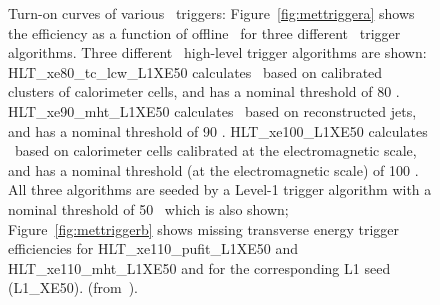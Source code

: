 				\begin{figure}[!htb]
					\centering
					\caption{Turn-on curves of various \met\ triggers: Figure~\ref{fig:mettriggera} shows the efficiency as a function of offline \met\ for three different \met\ trigger algorithms. Three different \met\ high-level trigger algorithms are shown: HLT\_xe80\_tc\_lcw\_L1XE50 calculates \met\ based on calibrated clusters of calorimeter cells, and has a nominal threshold of 80 \GeV. HLT\_xe90\_mht\_L1XE50 calculates \met\ based on reconstructed jets, and has a nominal threshold of 90 \GeV. HLT\_xe100\_L1XE50 calculates \met\ based on calorimeter cells calibrated at the electromagnetic scale, and has a nominal threshold (at the electromagnetic scale) of 100 \GeV. All three algorithms are seeded by a Level-1 trigger algorithm with a nominal threshold of 50 \GeV\ which is also shown; Figure~\ref{fig:mettriggerb} shows missing transverse energy trigger efficiencies for HLT\_xe110\_pufit\_L1XE50 and HLT\_xe110\_mht\_L1XE50 and for the corresponding L1 seed (L1\_XE50). (from~\cite{ATLASMETTriggerPublicPage}).}
					\label{fig:mettrigger}
				\end{figure}
